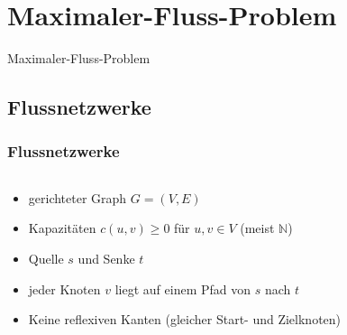 \documentclass[draft]{beamer}
\begin{document}
\section{Maximaler-Fluss-Problem}
\begin{frame}[plain]
\begin{center}
\begin{LARGE}
Maximaler-Fluss-Problem
\end{LARGE}
\end{center}
\end{frame}

\subsection{Flussnetzwerke}
\begin{frame}
\frametitle{Flussnetzwerke}
\begin{columns}
\begin{column}{.45\textwidth}
\begin{itemize}
\item<1-> gerichteter Graph $G=(V,E)$
\item<2-> Kapazitäten $c(u,v) \geq 0$ für $u,v \in V$ (meist $\mathbb{N}$)
\item<3-> Quelle $s$ und Senke $t$
\item<4-> jeder Knoten $v$ liegt auf einem Pfad von $s$ nach $t$
\item<5-> Keine reflexiven Kanten (gleicher Start- und Zielknoten)
\end{itemize}
\end{column}
\begin{column}{.6\textwidth}
\begin{adjustbox}{width=\textwidth}
\end{adjustbox}
\end{column}
\end{columns}
\end{frame}
\end{document}
